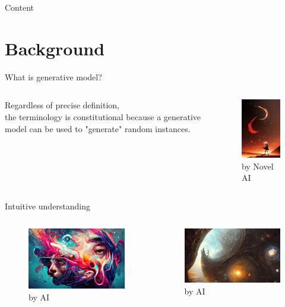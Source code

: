 \documentclass[aspectratio=169]{beamer}
\begin{document}
\begin{frame}{Content}
    \tableofcontents[hideallsubsections]
\end{frame}

\section{Background}

\begin{frame}{What is generative model?}
    \begin{columns}
        \par
        Regardless of precise definition, \\ the terminology is constitutional because a generative model can be used to "generate" random instances.
        \begin{figure}
            \centering
            \includegraphics[width=3.3cm]{../pic/ai1.png}
            \caption{by Novel AI}
        \end{figure}
    \end{columns}
\end{frame}

\begin{frame}{Intuitive understanding}
    \begin{columns}
        \begin{figure}
            \centering
            \includegraphics[width=5.5cm]{../pic/ai2.png}
            \caption{by AI}
        \end{figure}
        \begin{figure}
            \centering
            \includegraphics[width=5.5cm]{../pic/ai3.png}
            \caption{by AI}
        \end{figure}
    \end{columns}
\end{frame}
\end{document}
